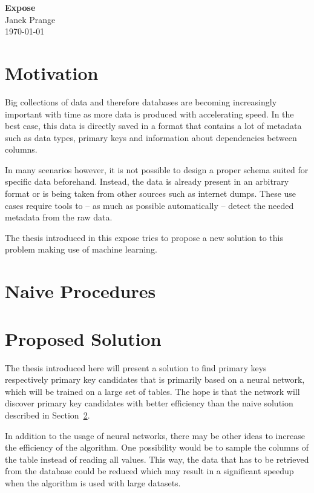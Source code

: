 \documentclass[a4paper]{article}
\begin{document}
\thispagestyle{firstpagestyle}
\begin{center}
  \huge \textbf{Expose}\\[8pt]
  \normalsize Janek Prange\\
  \today
\end{center}

\section{Motivation}
Big collections of data and therefore databases are becoming increasingly important with time as more data is produced with accelerating speed. In the best case, this data is directly saved in a format that contains a lot of metadata such as data types, primary keys and information about dependencies between columns.

In many scenarios however, it is not possible to design a proper schema suited for specific data beforehand. Instead, the data is already present in an arbitrary format or is being taken from other sources such as internet dumps. These use cases require tools to -- as much as possible automatically -- detect the needed metadata from the raw data. %

The thesis introduced in this expose tries to propose a new solution to this problem making use of machine learning.


\section{Naive Procedures}\label{sec:naiveProcedures}

\section{Proposed Solution}
The thesis introduced here will present a solution to find primary keys respectively primary key candidates that is primarily based on a neural network, which will be trained on a large set of tables. The hope is that the network will discover primary key candidates with better efficiency than the naive solution described in Section~\ref{sec:naiveProcedures}.

In addition to the usage of neural networks, there may be other ideas to increase the efficiency of the algorithm. One possibility would be to sample the columns of the table instead of reading all values. This way, the data that has to be retrieved from the database could be reduced which may result in a significant speedup when the algorithm is used with large datasets.
\end{document}
